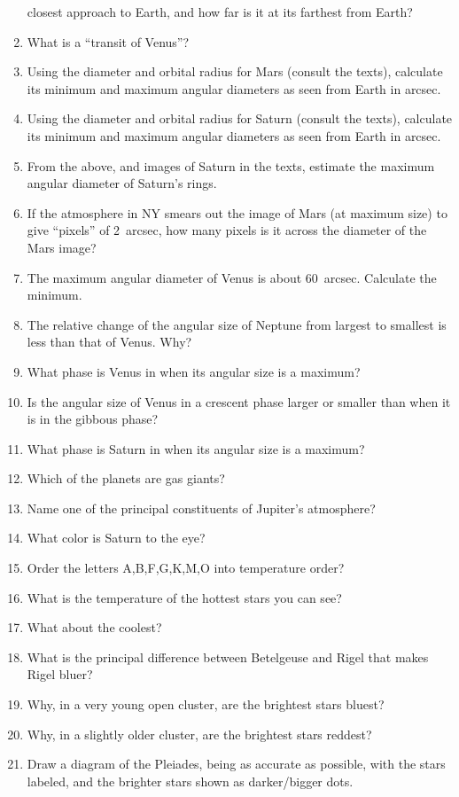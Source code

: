 \documentclass{article}
\begin{document}
\begin{enumerate}
closest approach to Earth, and how far is it at its farthest from
Earth?
\item
What is a ``transit of Venus''?
\item
Using the diameter and orbital radius for Mars (consult the texts),
calculate its minimum and maximum angular diameters as seen from Earth
in arcsec.
\item
Using the diameter and orbital radius for Saturn (consult the texts),
calculate its minimum and maximum angular diameters as seen from Earth
in arcsec.
\item
From the above, and images of Saturn in the texts, estimate the maximum
angular diameter of Saturn's rings.
\item
If the atmosphere in NY smears out the image of Mars (at maximum size)
to give ``pixels'' of 2~arcsec, how many pixels is it across the
diameter of the Mars image?
\item
The maximum angular diameter of Venus is about 60~arcsec. Calculate
the minimum.
\item
The relative change of the angular size of Neptune from largest to
smallest is less than that of Venus. Why?
\item
What phase is Venus in when its angular size is a maximum?
\item
Is the angular size of Venus in a crescent phase larger or smaller
than when it is in the gibbous phase?
\item
What phase is Saturn in when its angular size is a maximum?
\item
Which of the planets are gas giants?
\item
Name one of the principal constituents of Jupiter's atmosphere?
\item
What color is Saturn to the eye?
\item
Order the letters A,B,F,G,K,M,O into temperature order?
\item
What is the temperature of the hottest stars you can see?
\item
What about the coolest?
\item
What is the principal difference between Betelgeuse and Rigel that
makes Rigel bluer?
\item
Why, in a very young open cluster, are the brightest stars bluest?
\item
Why, in a slightly older cluster, are the brightest stars reddest?
\item
Draw a diagram of the Pleiades, being as accurate as possible, with
the stars labeled, and the brighter stars shown as darker/bigger dots.

\end{enumerate}
\end{document}
